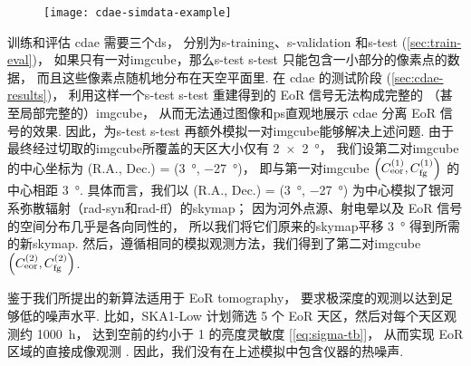 \begin{figure}[htp]
  \centering
  \texttt{[image: cdae-simdata-example]}
  \label{fig:cdae-simdata}
\end{figure}

训练和评估 \ac{cdae} 需要三个\ac{ds}，
分别为\acl{s-training}、\acl{s-validation} 和\acl{s-test}
(\autoref{sec:train-eval})，
如果只有一对\ac{imgcube}，那么\acl{s-test} \ac{s-test} 只能包含一小部分的像素点的数据，
而且这些像素点随机地分布在天空平面里.
在 \ac{cdae} 的测试阶段 (\autoref{sec:cdae-results})，
利用这样一个\acl{s-test} \ac{s-test} 重建得到的 EoR 信号无法构成完整的
（甚至局部完整的）\ac{imgcube}，
从而无法通过图像和\ac{ps}直观地展示 \ac{cdae} 分离 EoR 信号的效果.
因此，为\acl{s-test} \ac{s-test} 再额外模拟一对\ac{imgcube}能够解决上述问题.
由于最终经过切取的\ac{imgcube}所覆盖的天区大小仅有 \SI{2 x 2}{\degree}，
我们设第二对\ac{imgcube}的中心坐标为
(R.A., Dec.\@) = (\SI{3}{\degree}, \SI{-27}{\degree})，
即与第一对\ac{imgcube}
$\left( C_{\mathrm{eor}}^{(1)}, C_{\mathrm{fg}}^{(1)} \right)$
的中心相距 \SI{3}{\degree}.
具体而言，我们以 (R.A., Dec.\@) = (\SI{3}{\degree}, \SI{-27}{\degree})
为中心模拟了银河系弥散辐射（\ac{rad-syn}和\ac{rad-ff}）的\ac{skymap}；
因为河外点源、射电晕以及 EoR 信号的空间分布几乎是各向同性的，
所以我们将它们原来的\ac{skymap}平移 \SI{3}{\degree} 得到所需的新\ac{skymap}.
然后，遵循相同的模拟观测方法，我们得到了第二对\ac{imgcube}
$\left( C_{\mathrm{eor}}^{(2)}, C_{\mathrm{fg}}^{(2)} \right)$.

鉴于我们所提出的新算法适用于 EoR \ac{tomography}，
要求极深度的观测以达到足够低的噪声水平.
比如，SKA1-Low 计划筛选 5 个 EoR 天区，然后对每个天区观测约 \SI{1000}{\hour}，
达到空前的约小于 \SI{1}{\mK} 的亮度灵敏度 [\autoref{eq:sigma-tb}]，
从而实现 EoR 区域的直接成像观测 \cite{mellema2013,mellema2015,koopmans2015}.
因此，我们没有在上述模拟中包含仪器的热噪声.

